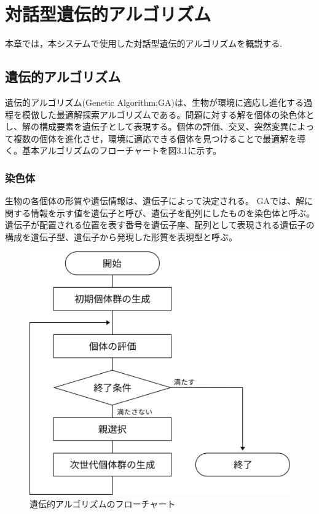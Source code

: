\chapter{対話型遺伝的アルゴリズム}
本章では，本システムで使用した対話型遺伝的アルゴリズムを概説する.
\section{遺伝的アルゴリズム}
遺伝的アルゴリズム(Genetic Algorithm;GA)は、生物が環境に適応し進化する過程を模倣した最適解探索アルゴリズムである。問題に対する解を個体の染色体とし、解の構成要素を遺伝子として表現する。個体の評価、交叉、突然変異によって複数の個体を進化させ，環境に適応できる個体を見つけることで最適解を導く。基本アルゴリズムのフローチャートを図3.1に示す。

\subsection{染色体}
生物の各個体の形質や遺伝情報は、遺伝子によって決定される。
GAでは、解に関する情報を示す値を遺伝子と呼び、遺伝子を配列にしたものを染色体と呼ぶ。
遺伝子が配置される位置を表す番号を遺伝子座、配列として表現される遺伝子の構成を遺伝子型、遺伝子から発現した形質を表現型と呼ぶ。

\begin{figure}[htbp]
	\begin{center}
		\includegraphics[scale=0.3]{image/flowchart.pdf}
		\caption{遺伝的アルゴリズムのフローチャート}
	\end{center}
\end{figure}

